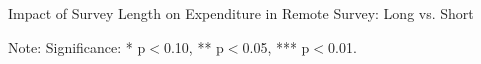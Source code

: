 \documentclass[11pt,harvard]{article}
\begin{document}
	
	\begin{table}[htbp]
		\centering
		\begin{adjustbox}{max width=\textwidth}
			\begin{threeparttable}
				\caption{Impact of Survey Length on Expenditure in Remote Survey: Long vs. Short}
				\scriptsize
				 
				\label{tab:Ecuador_FES_RM_Length_Balance}
				\begin{tablenotes}
					\item Note: Significance: * p$<$0.10, ** p$<$0.05, *** p$<$0.01. 
				\end{tablenotes}
			\end{threeparttable}
		\end{adjustbox}
	\end{table}
	
	\pagebreak
	
\end{document}

